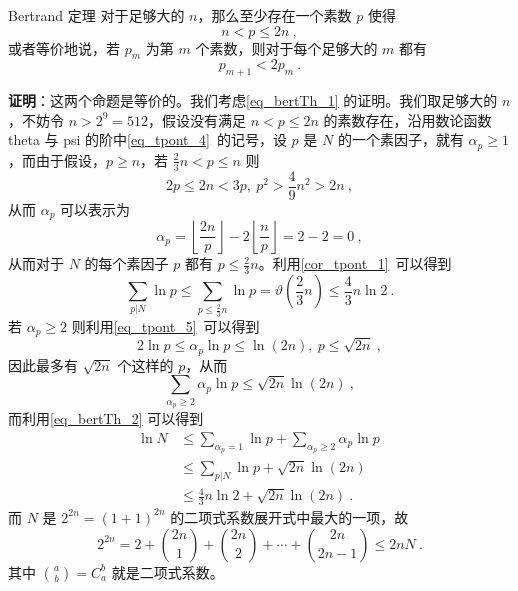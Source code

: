 

\begin{theorem}{Bertrand 定理}
对于足够大的 $n$，那么至少存在一个素数 $p$ 使得
\begin{equation}\label{eq_bertTh_1}
n < p \le 2n ~,
\end{equation}
或者等价地说，若 $p_m$ 为第 $m$ 个素数，则对于每个足够大的 $m$ 都有
\begin{equation}
p_{m+1} < 2 p_m ~.
\end{equation}

\end{theorem}

\textbf{证明}：这两个命题是等价的。我们考虑\autoref{eq_bertTh_1} 的证明。我们取足够大的 $n$，不妨令 $n > 2^9 = 512$，假设没有满足 $n < p \le 2n$ 的素数存在，沿用数论函数 theta 与 psi 的阶中\autoref{eq_tpont_4}~的记号，设 $p$ 是 $N$ 的一个素因子，就有 $\alpha_p \ge 1$，而由于假设，$p \ge n$，若 $\frac 23 n < p \le n$ 则
\begin{equation}
2p \le 2n < 3p, ~ p^2  > \frac 49 n^2 > 2n~,
\end{equation}
从而 $\alpha_p$ 可以表示为
\begin{equation}
\alpha_p = \left\lfloor \frac{2n}p \right\rfloor - 2 \left \lfloor \frac np \right \rfloor = 2 - 2 = 0 ~,
\end{equation}
从而对于 $N$ 的每个素因子 $p$ 都有 $p \le \frac23 n$。利用\autoref{cor_tpont_1}~可以得到
\begin{equation}\label{eq_bertTh_2}
\sum_{p | N} \ln p \le \sum_{p\le \frac 23 n} \ln p = \vartheta(\frac 23 n) \le \frac 43 n \ln 2 ~.
\end{equation}
若 $\alpha_p \ge 2$ 则利用\autoref{eq_tpont_5}~可以得到
\begin{equation}
2 \ln p \le \alpha_p \ln p \le \ln (2n), ~ p \le \sqrt{2n } ~,
\end{equation}
因此最多有 $\sqrt{2n}$ 个这样的 $p$，从而
\begin{equation}
\sum_{\alpha_p \ge 2} \alpha_p \ln p \le \sqrt{2n} \ln(2n) ~,
\end{equation}
而利用\autoref{eq_bertTh_2} 可以得到
\begin{equation}\label{eq_bertTh_3}
\begin{aligned}
\ln N &\le \sum_{\alpha_p = 1} \ln p + \sum_{\alpha_p \ge 2} \alpha_p \ln p ~\\
& \le \sum_{p | N} \ln p + \sqrt{2n} \ln(2n) ~\\
& \le \frac43 n \ln 2 + \sqrt{2n} \ln(2n) ~.
\end{aligned}
\end{equation}
而 $N$ 是 $2^{2n} = (1+1)^{2n}$ 的二项式系数展开式中最大的一项，故
\begin{equation}\label{eq_bertTh_4}
2^{2n} = 2 + \binom{2n}{1} + \binom{2n}{2} + \cdots + \binom{2n}{2n-1} \le 2nN ~.
\end{equation}
其中 $\binom{a}{b}  = C^b_a$ 就是二项式系数。


